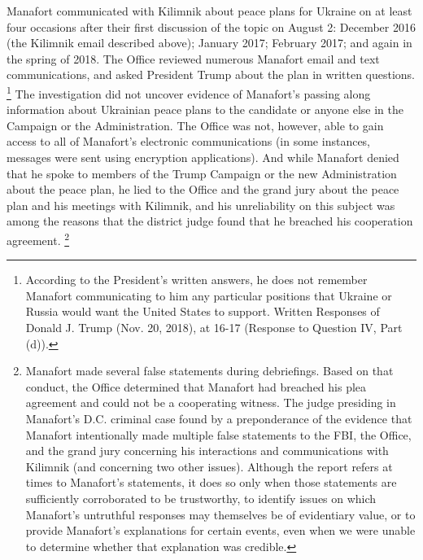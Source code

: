 Manafort communicated with Kilimnik about peace plans for Ukraine on at least four occasions after their first discussion of the topic on August 2: December 2016 (the Kilimnik email described above); January 2017; February 2017; and again in the spring of 2018.
The Office reviewed numerous Manafort email and text communications, and asked President Trump about the plan in written questions.%
\footnote{According to the President’s written answers, he does not remember Manafort communicating to him any particular positions that Ukraine or Russia would want the United States to support.
Written Responses of Donald J. Trump (Nov. 20, 2018), at 16-17 (Response to Question IV, Part (d)).}
The investigation did not uncover evidence of Manafort's passing along information about Ukrainian peace plans to the candidate or anyone else in the Campaign or the Administration.
The Office was not, however, able to gain access to all of Manafort's electronic communications (in some instances, messages were sent using encryption applications).
And while Manafort denied that he spoke to members of the Trump Campaign or the new Administration about the peace plan, he lied to the Office and the grand jury about the peace plan and his meetings with Kilimnik, and his unreliability on this subject was among the reasons that the district judge found that he breached his cooperation agreement.%
\footnote{Manafort made several false statements during debriefings. Based on that conduct, the Office determined that Manafort had breached his plea agreement and could not be a cooperating witness. The judge presiding in Manafort's D.C. criminal case found by a preponderance of the evidence that Manafort intentionally made multiple false statements to the FBI, the Office, and the grand jury concerning his interactions and communications with Kilimnik (and concerning two other issues). Although the report refers at times to Manafort's statements, it does so only when those statements are sufficiently corroborated to be trustworthy, to identify issues on which Manafort's untruthful responses may themselves be of evidentiary value, or to provide Manafort's explanations for certain events, even when we were unable to determine whether that explanation was credible.}

